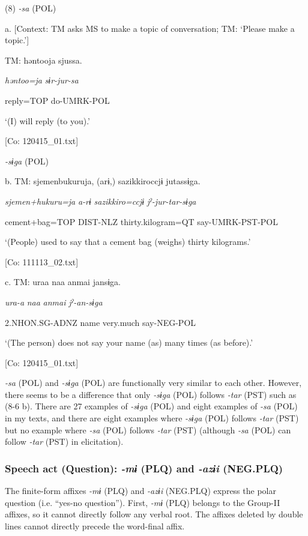 (8)  \textit{{}-sa} (POL)

  a.  [Context: TM asks MS to make a topic of conversation; TM: ‘Please make a topic.’]

    TM:  həntooja  sjussa.

      \textit{həntoo=ja}  \textit{sɨr-jur-sa}

      reply=TOP  do-UMRK-POL

      ‘(I) will reply (to you).’

      [Co: 120415\_01.txt]

  \textit{{}-sɨga} (POL)

  b.  TM:  sjemenbukuruja,  (arɨ,)  sazikkiroccjɨ  jutassɨga.

      \textit{sjemen+hukuru=ja}  \textit{a-rɨ}  \textit{sazikkiro=ccjɨ}  \textit{jˀ-jur-tar-sɨga}

      cement+bag=TOP  DIST-NLZ  thirty.kilogram=QT  say-UMRK-PST-POL

      ‘(People) used to say that a cement bag (weighs) thirty kilograms.’

      [Co: 111113\_02.txt]

  c.  TM:  uraa  naa  anmai  jansɨga.

      \textit{ura-a}  \textit{naa}  \textit{anmai}  \textit{jˀ-an-sɨga}

      2.NHON.SG-ADNZ  name  very.much  say-NEG-POL

      ‘(The person) does not say your name (as) many times (as before).’

      [Co: 120415\_01.txt]

\textit{{}-sa} (POL) and \textit{{}-sɨga} (POL) are functionally very similar to each other. However, there seems to be a difference that only \textit{{}-sɨga} (POL) follows \textit{{}-tar} (PST) such as (8-6 b). There are 27 examples of \textit{{}-sɨga} (POL) and eight examples of \textit{{}-sa} (POL) in my texts, and there are eight examples where \textit{{}-sɨga} (POL) follows \textit{{}-tar} (PST) but no example where \textit{{}-sa} (POL) follows \textit{-tar} (PST) (although \textit{-sa} (POL) can follow \textit{{}-tar} (PST) in elicitation).

\subsubsection{Speech act (Question): \textit{{}-mɨ} (PLQ) and \textit{{}-azɨi} (NEG.PLQ)}

The finite-form affixes \textit{{}-mɨ} (PLQ) and \textit{{}-azɨi} (NEG.PLQ) express the polar question (i.e. “yes-no question”).   First, \textit{{}-mɨ} (PLQ) belongs to the Group-II affixes, so it cannot directly follow any verbal root. The affixes deleted by double lines cannot directly precede the word-final affix.

